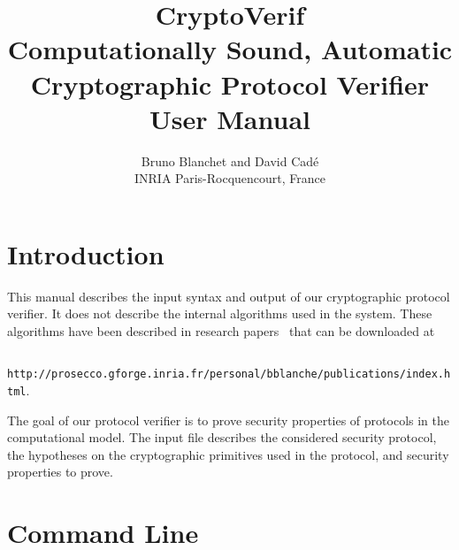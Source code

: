 \documentclass{article}
\begin{document}
\title{CryptoVerif\\
Computationally Sound, Automatic\\
Cryptographic Protocol Verifier\\
User Manual}

\author{Bruno Blanchet and David Cad{\'e}\\
INRIA Paris-Rocquencourt, France}

\maketitle

\tableofcontents

\section{Introduction}

This manual describes the input syntax and output of our cryptographic
protocol verifier. It does not describe the internal algorithms used
in the system. These algorithms have been described in research
papers~\cite{Blanchet06,BlanchetEPrint05,Blanchet06b,BlanchetPointchevalEPrint06}
that can be downloaded at

\centerline{{\tt
http://prosecco.gforge.inria.fr/personal/bblanche/publications/index.html}.}

The goal of our protocol verifier is to prove security properties
of protocols in the computational model. The input file describes
the considered security protocol, the hypotheses on the cryptographic
primitives used in the protocol, and security properties to prove.

\section{Command Line}
\end{document}
